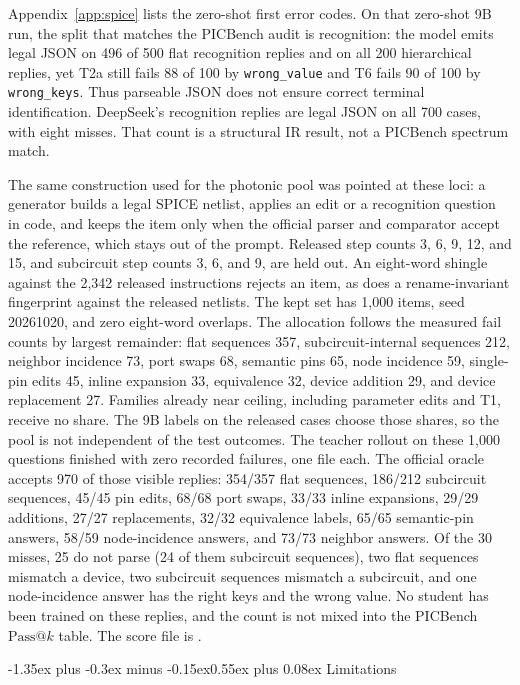 \documentclass[11pt]{article}
\makeatletter
\renewcommand\section{\@startsection{section}{1}{\z@}%
  {-1.35ex plus -0.3ex minus -0.15ex}{0.55ex plus 0.08ex}%
  {\normalfont\large\bfseries}}
\newcommand{\passk}[1]{\mathrm{Pass@}#1}
\makeatother
\begin{document}
Appendix~\ref{app:spice} lists the zero-shot first error codes.
On that zero-shot 9B run, the split that matches the PICBench audit is recognition: the model emits legal JSON on 496 of 500 flat recognition replies and on all 200 hierarchical replies, yet T2a still fails 88 of 100 by \texttt{wrong\_value} and T6 fails 90 of 100 by \texttt{wrong\_keys}.
Thus parseable JSON does not ensure correct terminal identification.
DeepSeek's recognition replies are legal JSON on all 700 cases, with eight misses.
That count is a structural IR result, not a PICBench spectrum match.

The same construction used for the photonic pool was pointed at these loci: a generator builds a legal SPICE netlist, applies an edit or a recognition question in code, and keeps the item only when the official parser and comparator accept the reference, which stays out of the prompt.
Released step counts 3, 6, 9, 12, and 15, and subcircuit step counts 3, 6, and 9, are held out.
An eight-word shingle against the 2{,}342 released instructions rejects an item, as does a rename-invariant fingerprint against the released netlists.
The kept set has 1{,}000 items, seed 20261020, and zero eight-word overlaps.
The allocation follows the measured fail counts by largest remainder: flat sequences 357, subcircuit-internal sequences 212, neighbor incidence 73, port swaps 68, semantic pins 65, node incidence 59, single-pin edits 45, inline expansion 33, equivalence 32, device addition 29, and device replacement 27.
Families already near ceiling, including parameter edits and T1, receive no share.
The 9B labels on the released cases choose those shares, so the pool is not independent of the test outcomes.
The teacher rollout on these 1{,}000 questions finished with zero recorded failures, one file each.
The official oracle accepts 970 of those visible replies: 354/357 flat sequences, 186/212 subcircuit sequences, 45/45 pin edits, 68/68 port swaps, 33/33 inline expansions, 29/29 additions, 27/27 replacements, 32/32 equivalence labels, 65/65 semantic-pin answers, 58/59 node-incidence answers, and 73/73 neighbor answers.
Of the 30 misses, 25 do not parse (24 of them subcircuit sequences), two flat sequences mismatch a device, two subcircuit sequences mismatch a subcircuit, and one node-incidence answer has the right keys and the wrong value.
No student has been trained on these replies, and the count is not mixed into the PICBench $\passk{k}$ table.
The score file is .

\section{Limitations}
\label{sec:limits}
\end{document}
